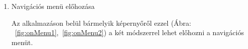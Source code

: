 \documentclass[../main.tex]{subfiles}
\begin{document}
            \begin{enumerate}
                \item Navigációs menü előhozása
                
                    Az alkalmazáson belül bármelyik képernyőről ezzel (Ábra:  ~\ref{fig:onMenu1},~\ref{fig:onMenu2}) a két módszerrel lehet előhozni a navigációs menüt.
                    \begin{figure}[!h]
                        \begin{floatrow}
                        \end{floatrow}
                    \end{figure}\\
                    

\end{enumerate}
\end{document}
